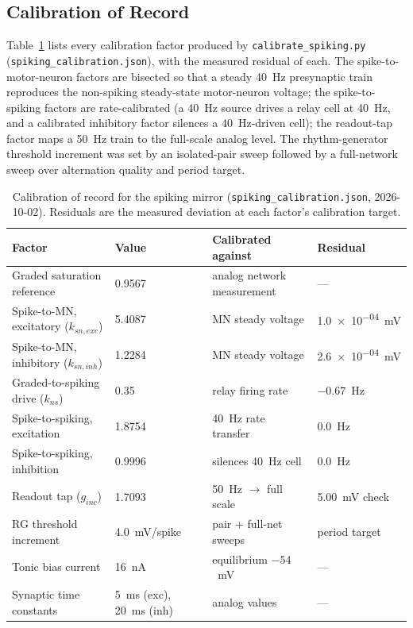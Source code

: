 \subsection{Calibration of Record}

Table~\ref{tab:app_spk_cal} lists every calibration factor produced by \texttt{calibrate\_spiking.py} (\texttt{spiking\_calibration.json}), with the measured residual of each. The spike-to-motor-neuron factors are bisected so that a steady \qty{40}{\hertz} presynaptic train reproduces the non-spiking steady-state motor-neuron voltage; the spike-to-spiking factors are rate-calibrated (a \qty{40}{\hertz} source drives a relay cell at \qty{40}{\hertz}, and a calibrated inhibitory factor silences a \qty{40}{\hertz}-driven cell); the readout-tap factor maps a \qty{50}{\hertz} train to the full-scale analog level. The rhythm-generator threshold increment was set by an isolated-pair sweep followed by a full-network sweep over alternation quality and period target.

\begin{table}[htbp]
\caption{Calibration of record for the spiking mirror (\texttt{spiking\_calibration.json}, 2026-10-02). Residuals are the measured deviation at each factor's calibration target.}
\label{tab:app_spk_cal}
\begin{tabular}{@{}llll@{}}
\toprule
\textbf{Factor} & \textbf{Value} & \textbf{Calibrated against} & \textbf{Residual} \\
\midrule
Graded saturation reference & 0.9567 & analog network measurement & --- \\
Spike-to-MN, excitatory ($k_{sn,exc}$) & 5.4087 & MN steady voltage & \qty{1.0e-04}{\mV} \\
Spike-to-MN, inhibitory ($k_{sn,inh}$) & 1.2284 & MN steady voltage & \qty{2.6e-04}{\mV} \\
Graded-to-spiking drive ($k_{ns}$) & 0.35 & relay firing rate & $-0.67$~Hz \\
Spike-to-spiking, excitation & 1.8754 & \qty{40}{\hertz} rate transfer & \qty{0.0}{\hertz} \\
Spike-to-spiking, inhibition & 0.9996 & silences \qty{40}{\hertz} cell & \qty{0.0}{\hertz} \\
Readout tap ($g_{inc}$) & 1.7093 & \qty{50}{\hertz} $\to$ full scale & \qty{5.00}{\mV} check \\
RG threshold increment & 4.0~mV/spike & pair + full-net sweeps & period target \\
Tonic bias current & 16~nA & equilibrium $-54$~mV & --- \\
Synaptic time constants & 5~ms (exc), 20~ms (inh) & analog values & --- \\
\bottomrule
\end{tabular}
\end{table}

